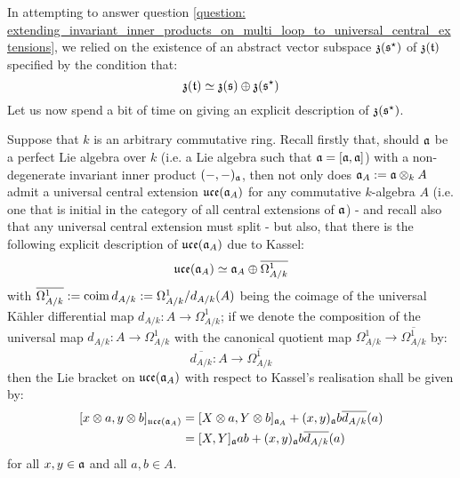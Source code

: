             \begin{remark} \label{remark: centres_of_dual_toroidal_lie_bialgebras}
                In attempting to answer question \ref{question: extending_invariant_inner_products_on_multi_loop_to_universal_central_extensions}, we relied on the existence of an abstract vector subspace $\mathfrak{z}(\mathfrak{s}^{\star})$ of $\mathfrak{z}(\mathfrak{t})$ specified by the condition that:
                    $$\mathfrak{z}(\mathfrak{t}) \simeq \mathfrak{z}(\mathfrak{s}) \oplus \mathfrak{z}(\mathfrak{s}^{\star})$$
                Let us now spend a bit of time on giving an explicit description of $\mathfrak{z}(\mathfrak{s}^{\star})$. 

                Suppose that $k$ is an arbitrary commutative ring. Recall firstly that, should $\mathfrak{a}$ be a perfect Lie algebra over $k$ (i.e. a Lie algebra such that $\mathfrak{a} = [\mathfrak{a}, \mathfrak{a}]$) with a non-degenerate invariant inner product $(-, -)_{\mathfrak{a}}$, then not only does $\a_A := \a \tensor_k A$ admit a universal central extension $\mathfrak{uce}(\mathfrak{a}_A)$ for any commutative $k$-algebra $A$ (i.e. one that is initial in the category of all central extensions of $\mathfrak{a}$) - and recall also that any universal central extension must split - but also, that there is the following explicit description of $\mathfrak{uce}(\mathfrak{a}_A)$ due to Kassel:
                    $$\mathfrak{uce}(\mathfrak{a}_A) \simeq \mathfrak{a}_A \oplus \overline{\Omega^1_{A/k}}$$
                with $\overline{\Omega^1_{A/k}} := \operatorname{coim} d_{A/k} := \Omega^1_{A/k}/d_{A/k}(A)$ being the coimage of the universal K\"ahler differential map $d_{A/k}: A \to \Omega^1_{A/k}$; if we denote the composition of the universal map $d_{A/k}: A \to \Omega^1_{A/k}$ with the canonical quotient map $\Omega^1_{A/k} \to \overline{\Omega^1_{A/k}}$ by:
                    $$\overline{d_{A/k}}: A \to \overline{\Omega^1_{A/k}}$$
                then the Lie bracket on $\mathfrak{uce}(\mathfrak{a}_A)$ with respect to Kassel's realisation shall be given by:
                    $$
                        \begin{aligned}
                            [ x \tensor a, y \tensor b ]_{\uce(\a_A)} & = [ X \tensor a, Y \tensor b ]_{\a_A} + (x, y)_{\a} b \overline{d_{A/k}}(a)
                            \\
                            & = [X, Y]_{\a} ab + (x, y)_{\a} b \overline{d_{A/k}}(a)
                        \end{aligned}
                    $$
                for all $x, y \in \mathfrak{a}$ and all $a, b \in A$.
                    

\end{remark}
